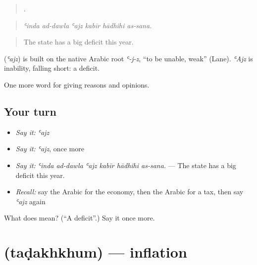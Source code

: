 \begin{quote}
     .
\end{quote}

\begin{quote}
\emph{ʿinda ad-dawla ʿajz kabīr hādhihi as-sana.}
\end{quote}

\begin{quote}
The state has a big deficit this year.
\end{quote}

\begin{cousinweb}
\textbf{} (\emph{ʿajz}) is built on the native Arabic root \emph{ʿ-j-z}, \textquotedblleft{}to be unable, weak\textquotedblright{} (Lane). \emph{ʿAjz} is inability, falling short: a deficit.
\end{cousinweb}

\begin{grammarlens}[title={What you've built}]
One more word for giving reasons and opinions.
\end{grammarlens}

\subsection*{Your turn}
\begin{itemize}
\raggedright
  \item \emph{Say it:} \emph{ʿajz}
  \item \emph{Say it:} \emph{ʿajz}, once more
  \item \emph{Say it:} \emph{ʿinda ad-dawla ʿajz kabīr hādhihi as-sana.} — The state has a big deficit this year.
  \item \emph{Recall:} say the Arabic for the economy, then the Arabic for a tax, then say \emph{ʿajz} again
\end{itemize}

\begin{tcolorbox}[breakable,colback=teal!4,colframe=teal!35!black,title={Before you move on}]
What does  mean? (\textquotedblleft{}A deficit\textquotedblright{}.) Say it once more.
\end{tcolorbox}
\section[\texorpdfstring{\ar{تضخم} (taḍakhkhum)}{تضخم (taḍakhkhum)}]{ (taḍakhkhum) — inflation}

\label{lesson:AR-C383-tadakhkhum}



